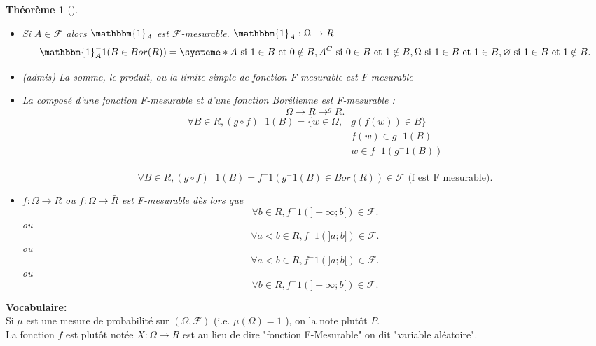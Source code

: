 \documentclass{article}
\theoremstyle{plain}%
\newtheorem{thm}{Théorème}[section]
\theoremstyle{definition}
\theoremstyle{remark}
\begin{document}
\begin{thm}[]
    \begin{itemize}
        \item Si $ A \in \mathcal{F} $ alors $ \mathbbm{1}_{A} $ est $ \mathcal{F} $-mesurable. $ \mathbbm{1}_{A}: \Omega \to R $ 
        \[
            \mathbbm{1}_{A}^-1(B \in Bor(R)) = \systeme*{
                A \text{ si } 1 \in B \text{ et } 0 \notin B,
                A^C \text{ si } 0 \in B \text{ et } 1 \notin B,
                \Omega \text{ si } 1 \in B \text{ et } 1 \in B,
                \varnothing \text{ si } 1 \in B \text{ et } 1 \notin B
            }
            .\]
        \item (admis) La somme, le produit, ou la limite simple de fonction F-mesurable est F-mesurable 
        \item La composé d'une fonction F-mesurable et d'une fonction Borélienne est F-mesurable : 
        \[
            \Omega \longrightarrow R \longrightarrow^g R
        .\]
        \begin{align*}
            \forall B \in R, (g \circ f)^-1(B) = \{w \in \Omega , & g(f(w)) \in B\} \\
                            & f(w) \in g^-1(B) \\
                            & w \in f^-1(g^-1(B)) \\
                        \end{align*}
        
                        \[
            \forall B \in R, (g \circ f)^-1(B) = f^-1(g^-1(B) \in Bor(R)) \in \mathcal{F} \text{ (f est F mesurable)}
            .\]

            \item $ f: \Omega \to R $ ou $ f: \Omega \to \bar{R} $ est F-mesurable dès lors que 
            \[
                \forall b \in R, f^-1 (]-\infty ; b[) \in \mathcal{F}
                .\]
        ou 
        \[
            \forall a < b \in R, f^-1(]a;b]) \in \mathcal{F}
        .\]
        ou
        \[
            \forall a < b \in R, f^-1(]a;b[) \in \mathcal{F}
            .\]
        ou 
        \[
            \forall b \in R, f^-1 (]-\infty ; b[) \in \mathcal{F}
        .\]
    \end{itemize}
\end{thm}

\textbf{Vocabulaire:} \\
Si $ \mu  $ est une mesure de probabilité sur $ (\Omega , \mathcal{F}) $ (i.e. $ \mu (\Omega ) = 1  $ ), on la note plutôt $ P $. \\
La fonction $ f $ est plutôt notée $ X: \Omega \to R $ est au lieu de dire "fonction F-Mesurable" on dit "variable aléatoire". \\
\end{document}
